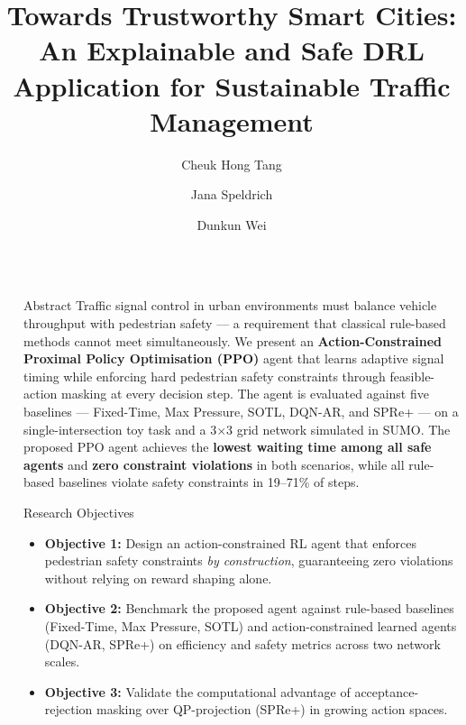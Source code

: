 \documentclass[final,20pt]{beamer}
\title{Towards Trustworthy Smart Cities: An Explainable and Safe DRL Application for Sustainable Traffic Management}
\author{Cheuk Hong Tang \inst{1} \and Jana Speldrich \inst{1} \and Dunkun Wei \inst{1}}
\institute[shortinst]{%
  \inst{1} Department of Computer Science, National Yang Ming Chiao Tung University}
\newlength{\sepwidth}
\newlength{\colwidth}
\newcommand{\separatorcolumn}{\begin{column}{\sepwidth}\end{column}}
\begin{document}
\begin{frame}[t]
\begin{columns}[t]
\separatorcolumn

\begin{column}{\colwidth}

  \begin{block}{Abstract}
    Traffic signal control in urban environments must balance vehicle throughput
    with pedestrian safety --- a requirement that classical rule-based methods
    cannot meet simultaneously. We present an \textbf{Action-Constrained
    Proximal Policy Optimisation (PPO)} agent that learns adaptive signal timing
    while enforcing hard pedestrian safety constraints through feasible-action
    masking at every decision step. The agent is evaluated against five
    baselines --- Fixed-Time, Max Pressure, SOTL, DQN-AR, and SPRe+ --- on a
    single-intersection toy task and a 3$\times$3 grid network simulated in
    SUMO. The proposed PPO agent achieves the \textbf{lowest waiting time among
    all safe agents} and \textbf{zero constraint violations} in both scenarios,
    while all rule-based baselines violate safety constraints in 19--71\% of
    steps.
  \end{block}

  \begin{alertblock}{Research Objectives}
    \begin{itemize}
      \item \textbf{Objective 1:} Design an action-constrained RL agent that
        enforces pedestrian safety constraints \emph{by construction}, guaranteeing
        zero violations without relying on reward shaping alone.
      \item \textbf{Objective 2:} Benchmark the proposed agent against
        rule-based baselines (Fixed-Time, Max Pressure, SOTL) and
        action-constrained learned agents (DQN-AR, SPRe+) on efficiency and
        safety metrics across two network scales.
      \item \textbf{Objective 3:} Validate the computational advantage of
        acceptance-rejection masking over QP-projection (SPRe+) in growing
        action spaces.
    \end{itemize}
  \end{alertblock}


\end{column}
\end{columns}
\end{frame}
\end{document}
